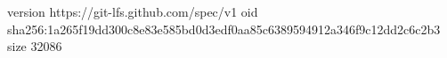 version https://git-lfs.github.com/spec/v1
oid sha256:1a265f19dd300c8e83e585bd0d3edf0aa85c6389594912a346f9c12dd2c6c2b3
size 32086
